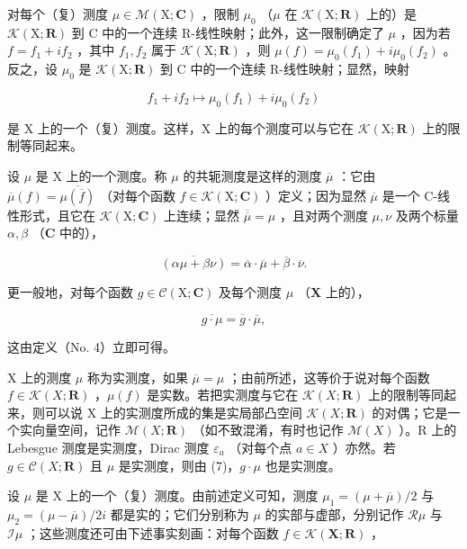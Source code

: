 对每个（复）测度 \(\mu\in\mathcal{M}(\mathrm{X};\mathbf{C})\) ，限制 \(\mu_{0}\) （\(\mu\) 在 \(\mathcal{K}(\mathrm{X};\mathbf{R})\) 上的）是 \(\mathcal{K}(\mathrm{X};\mathbf{R})\) 到 C 中的一个连续 R-线性映射；此外，这一限制确定了 \(\mu\) ，因为若 \(f=f_{1}+if_{2}\) ，其中 \(f_{1},f_{2}\) 属于 \(\mathcal{K}(\mathrm{X};\mathbf{R})\) ，则 \(\mu(f)=\mu_{0}(f_{1})+i\mu_{0}(f_{2})\) 。反之，设 \(\mu_{0}\) 是 \(\mathcal{K}(\mathrm{X};\mathbf{R})\) 到 C 中的一个连续 R-线性映射；显然，映射

\[
f _ {1} + i f _ {2} \mapsto \mu_ {0} (f _ {1}) + i \mu_ {0} (f _ {2})
\]

是 X 上的一个（复）测度。这样，X 上的每个测度可以与它在 \(\mathcal{K}(\mathrm{X};\mathbf{R})\) 上的限制等同起来。

设 \(\mu\) 是 X 上的一个测度。称 \(\mu\) 的共轭测度是这样的测度 \(\overline{\mu}\) ：它由 \(\overline{\mu}(f) = \overline{\mu(\overline{f})}\) （对每个函数 \(f \in \mathcal{K}(\mathrm{X};\mathbf{C})\) ）定义；因为显然 \(\overline{\mu}\) 是一个 C-线性形式，且它在 \(\mathcal{K}(\mathrm{X};\mathbf{C})\) 上连续；显然 \(\overline{\overline{\mu}} = \mu\) ，且对两个测度 \(\mu, \nu\) 及两个标量 \(\alpha, \beta\) （\(\mathbf{C}\) 中的），

\[
\overline {{(\alpha \mu + \beta \nu)}} = \overline {{\alpha}} \cdot \overline {{\mu}} + \overline {{\beta}} \cdot \overline {{\nu}}.
\]

更一般地，对每个函数 \(g \in \mathcal{C}(\mathrm{X};\mathbf{C})\) 及每个测度 \(\mu\) （\(\mathbf{X}\) 上的），

\[
\overline {{{g \cdot \mu}}} = \overline {{{g}}} \cdot \overline {{{\mu}}},\tag{7}
\]

这由定义（No. 4）立即可得。

X 上的测度 \(\mu\) 称为实测度，如果 \(\overline{\mu} = \mu\) ；由前所述，这等价于说对每个函数 \(f \in \mathcal{K}(X; \mathbf{R})\) ，\(\mu(f)\) 是实数。若把实测度与它在 \(\mathcal{K}(X; \mathbf{R})\) 上的限制等同起来，则可以说 X 上的实测度所成的集是实局部凸空间 \(\mathcal{K}(X; \mathbf{R})\) 的对偶；它是一个实向量空间，记作 \(\mathcal{M}(X; \mathbf{R})\) （如不致混淆，有时也记作 \(\mathcal{M}(X)\) ）。R 上的 Lebesgue 测度是实测度，Dirac 测度 \(\varepsilon_{a}\) （对每个点 \(a \in X\) ）亦然。若 \(g \in \mathcal{C}(X; \mathbf{R})\) 且 \(\mu\) 是实测度，则由 (7)，\(g \cdot \mu\) 也是实测度。

设 \(\mu\) 是 X 上的一个（复）测度。由前述定义可知，测度 \(\mu_{1} = (\mu +\overline{\mu}) / 2\) 与 \(\mu_{2} = (\mu -\overline{\mu}) / 2i\) 都是实的；它们分别称为 \(\mu\) 的实部与虚部，分别记作 \(\mathcal{R}\mu\) 与 \(\mathcal{I}\mu\) ；这些测度还可由下述事实刻画：对每个函数 \(f\in \mathcal{K}(\mathbf{X};\mathbf{R})\) ，

